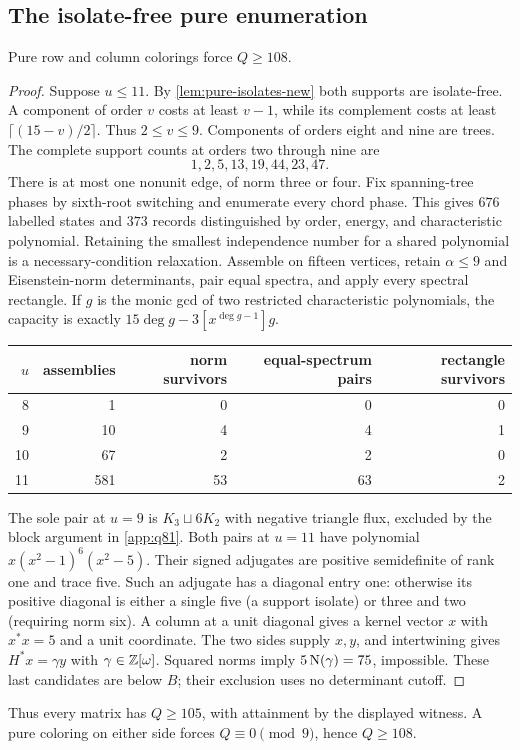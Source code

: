\subsection{The isolate-free pure enumeration}
\begin{theorem}\label{thm:pure15-new}
Pure row and column colorings force $Q\ge108$.
\end{theorem}
\begin{proof}
Suppose $u\le11$. By \cref{lem:pure-isolates-new} both supports are isolate-free. A component of order $v$ costs at least $v-1$, while its complement costs at least $\lceil(15-v)/2\rceil$. Thus $2\le v\le9$. Components of orders eight and nine are trees. The complete support counts at orders two through nine are
\[1,2,5,13,19,44,23,47.\]
There is at most one nonunit edge, of norm three or four. Fix spanning-tree phases by sixth-root switching and enumerate every chord phase. This gives $676$ labelled states and $373$ records distinguished by order, energy, and characteristic polynomial. Retaining the smallest independence number for a shared polynomial is a necessary-condition relaxation.
Assemble on fifteen vertices, retain $\alpha\le9$ and Eisenstein-norm determinants, pair equal spectra, and apply every spectral rectangle. If $g$ is the monic gcd of two restricted characteristic polynomials, the capacity is exactly $15\deg g-3[x^{\deg g-1}]g$.
\begin{center}\begin{tabular}{rrrrr}\toprule
$u$&assemblies&norm survivors&equal-spectrum pairs&rectangle survivors\\\midrule
8&1&0&0&0\\9&10&4&4&1\\10&67&2&2&0\\11&581&53&63&2\\\bottomrule
\end{tabular}\end{center}
The sole pair at $u=9$ is $K_3\sqcup6K_2$ with negative triangle flux, excluded by the block argument in \cref{app:q81}. Both pairs at $u=11$ have polynomial $x(x^2-1)^6(x^2-5)$. Their signed adjugates are positive semidefinite of rank one and trace five. Such an adjugate has a diagonal entry one: otherwise its positive diagonal is either a single five (a support isolate) or three and two (requiring norm six). A column at a unit diagonal gives a kernel vector $x$ with $x^*x=5$ and a unit coordinate. The two sides supply $x,y$, and intertwining gives $H^*x=\gamma y$ with $\gamma\in\mathbb Z[\omega]$. Squared norms imply $5\operatorname N(\gamma)=75$, impossible. These last candidates are below $B$; their exclusion uses no determinant cutoff.
\end{proof}
Thus every matrix has $Q\ge105$, with attainment by the displayed witness. A pure coloring on either side forces $Q\equiv0\pmod9$, hence $Q\ge108$.

